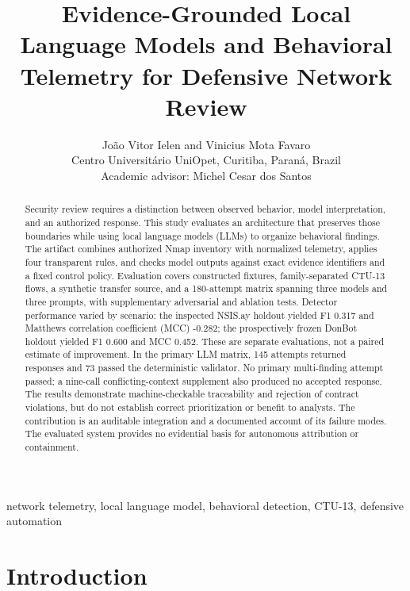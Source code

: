 \documentclass[11pt,a4paper,onecolumn]{IEEEtran}
\newcommand{\articleTitle}{Evidence-Grounded Local Language Models and Behavioral Telemetry for Defensive Network Review}
\begin{document}
\title{\articleTitle}
\author{João Vitor Ielen and Vinicius Mota Favaro\\
\normalsize Centro Universitário UniOpet, Curitiba, Paraná, Brazil\\
\normalsize Academic advisor: Michel Cesar dos Santos}
\maketitle

\begin{abstract}
Security review requires a distinction between observed behavior, model interpretation, and an authorized response. This study evaluates an architecture that preserves those boundaries while using local language models (LLMs) to organize behavioral findings. The artifact combines authorized Nmap inventory with normalized telemetry, applies four transparent rules, and checks model outputs against exact evidence identifiers and a fixed control policy. Evaluation covers constructed fixtures, family-separated CTU-13 flows, a synthetic transfer source, and a 180-attempt matrix spanning three models and three prompts, with supplementary adversarial and ablation tests. Detector performance varied by scenario: the inspected NSIS.ay holdout yielded F1 0.317 and Matthews correlation coefficient (MCC) -0.282; the prospectively frozen DonBot holdout yielded F1 0.600 and MCC 0.452. These are separate evaluations, not a paired estimate of improvement. In the primary LLM matrix, 145 attempts returned responses and 73 passed the deterministic validator. No primary multi-finding attempt passed; a nine-call conflicting-context supplement also produced no accepted response. The results demonstrate machine-checkable traceability and rejection of contract violations, but do not establish correct prioritization or benefit to analysts. The contribution is an auditable integration and a documented account of its failure modes. The evaluated system provides no evidential basis for autonomous attribution or containment.
\end{abstract}

\begin{IEEEkeywords}
network telemetry, local language model, behavioral detection, CTU-13, defensive automation
\end{IEEEkeywords}

\section{Introduction}
\end{document}
